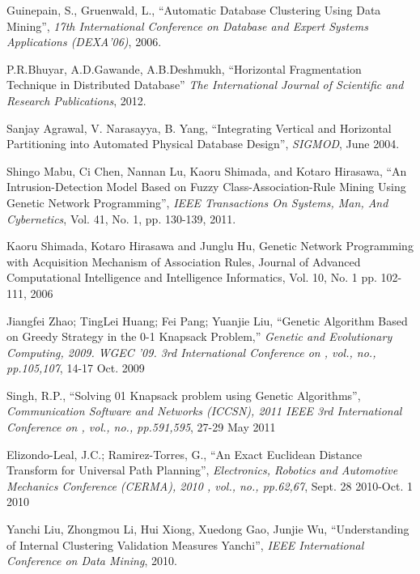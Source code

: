 \documentclass[fleqn,10pt,twocolumn]{SICE14}
\begin{document}
\begin{thebibliography}{9}

Guinepain, S., Gruenwald, L., ``Automatic Database Clustering Using Data Mining'', {\it 17th International Conference on Database and Expert Systems Applications (DEXA'06)}, 
2006.

P.R.Bhuyar, A.D.Gawande, A.B.Deshmukh, ``Horizontal Fragmentation Technique in Distributed Database'' {\it The International Journal of Scientific and Research Publications}, 2012.

Sanjay Agrawal, V. Narasayya, B. Yang, ``Integrating Vertical and
Horizontal Partitioning into Automated Physical Database Design'',
{\it SIGMOD}, June 2004.

Shingo Mabu, Ci Chen, Nannan Lu, Kaoru Shimada,
and Kotaro Hirasawa, ``An Intrusion-Detection Model Based on Fuzzy Class-Association-Rule Mining Using Genetic Network Programming'',
{\it IEEE Transactions On Systems, Man, And Cybernetics}, Vol. 41, No. 1, pp. 130-139, 2011.

Kaoru Shimada, Kotaro Hirasawa and Junglu Hu, Genetic Network Programming with Acquisition Mechanism of Association Rules, Journal of Advanced Computational Intelligence and Intelligence Informatics, Vol. 10, No. 1 pp. 102-111, 2006

Jiangfei Zhao; TingLei Huang; Fei Pang; Yuanjie Liu, ``Genetic Algorithm Based on Greedy Strategy in the 0-1 Knapsack Problem,'' {\it Genetic and Evolutionary Computing, 2009. WGEC '09. 3rd International Conference on , vol., no., pp.105,107}, 14-17 Oct. 2009

Singh, R.P., ``Solving 01 Knapsack problem using Genetic Algorithms'', {\it Communication Software and Networks (ICCSN), 2011 IEEE 3rd International Conference on , vol., no., pp.591,595}, 27-29 May 2011


Elizondo-Leal, J.C.; Ramirez-Torres, G., ``An Exact Euclidean Distance Transform for Universal Path Planning'', {\it Electronics, Robotics and Automotive Mechanics Conference (CERMA), 2010 , vol., no., pp.62,67}, Sept. 28 2010-Oct. 1 2010

Yanchi Liu, Zhongmou Li, Hui Xiong, Xuedong Gao, Junjie Wu, ``Understanding of Internal Clustering Validation Measures Yanchi'',
{\it IEEE International Conference on Data Mining}, 2010.

\end{thebibliography}
\end{document}
